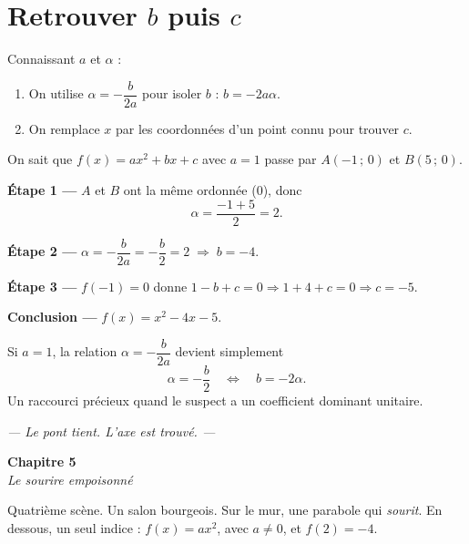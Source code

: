 \documentclass[11pt,a4paper]{article}
\newcommand{\chapterheader}[2]{%
  \clearpage
  \begin{tcolorbox}[
    enhanced,
    colback=ink, colframe=ink,
    interior style={top color=ink, bottom color=charcoal, shading angle=90},
    boxrule=0pt, arc=0pt,
    left=18pt, right=18pt, top=14pt, bottom=14pt,
    width=\textwidth,
  ]
    {\color{white}\Huge\bfseries #1}\\[6pt]
    {\color{silver}\large\itshape #2}
  \end{tcolorbox}
  \vspace{6pt}
}
\begin{document}
\section{Retrouver \texorpdfstring{$b$}{b} puis \texorpdfstring{$c$}{c}}

\begin{methode}
Connaissant $a$ et $\alpha$ :
\begin{enumerate}[leftmargin=*]
  \item On utilise $\alpha = -\dfrac{b}{2a}$ pour isoler $b$ : $b = -2a\alpha$.
  \item On remplace $x$ par les coordonnées d'un point connu pour trouver $c$.
\end{enumerate}
\end{methode}

\begin{rapport}
On sait que $f(x) = ax^2+bx+c$ avec $a = 1$ passe par $A(-1\,;\,0)$ et $B(5\,;\,0)$.

\textbf{Étape 1 —} $A$ et $B$ ont la même ordonnée ($0$), donc
\[
  \alpha = \frac{-1 + 5}{2} = 2.
\]

\textbf{Étape 2 —} $\alpha = -\dfrac{b}{2a} = -\dfrac{b}{2} = 2 \;\Longrightarrow\; b = -4$.

\textbf{Étape 3 —} $f(-1) = 0$ donne $1 - b + c = 0 \Rightarrow 1 + 4 + c = 0 \Rightarrow c = -5$.

\textbf{Conclusion —} $f(x) = x^2 - 4x - 5$.
\end{rapport}

\begin{methode}[Cas particulier $a = 1$]
Si $a = 1$, la relation $\alpha = -\dfrac{b}{2a}$ devient simplement
\[
  \alpha = -\frac{b}{2} \quad\Longleftrightarrow\quad b = -2\alpha.
\]
Un raccourci précieux quand le suspect a un coefficient dominant unitaire.
\end{methode}

\vfill
\begin{center}
\textcolor{slate}{\itshape\small — Le pont tient. L'axe est trouvé. —}
\end{center}

\chapterheader{Chapitre 5}{Le sourire empoisonné}

Quatrième scène. Un salon bourgeois. Sur le mur, une parabole qui \emph{sourit}. En dessous, un seul indice : $f(x) = ax^2$, avec $a \neq 0$, et $f(2) = -4$.
\end{document}
